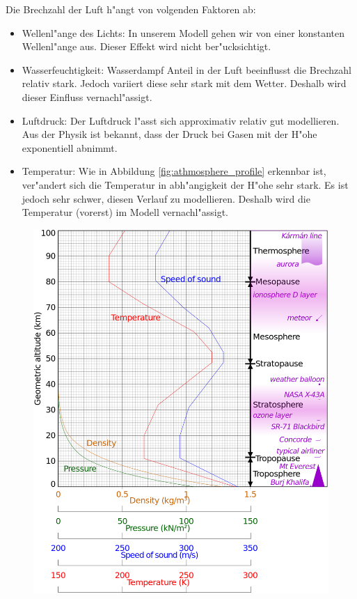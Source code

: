\begin{refsection}
Die Brechzahl der Luft h"angt von volgenden Faktoren ab:
\begin{itemize}
  \item Wellenl"ange des Lichts: In unserem Modell gehen wir von einer konstanten Wellenl"ange aus. Dieser Effekt wird nicht ber"ucksichtigt.
  \item Wasserfeuchtigkeit: Wasserdampf Anteil in der Luft beeinflusst die Brechzahl relativ stark. Jedoch variiert diese sehr stark mit dem Wetter. Deshalb wird dieser Einfluss vernachl"assigt. 
  \item Luftdruck: Der Luftdruck l"asst sich approximativ relativ gut modellieren. Aus der Physik ist bekannt, dass der Druck bei Gasen mit der H"ohe exponentiell abnimmt. 
  \item Temperatur: Wie in Abbildung \ref{fig:athmosphere_profile} erkennbar ist, ver"andert sich die Temperatur in abh"angigkeit der H"ohe sehr stark. Es ist jedoch sehr schwer, diesen Verlauf zu modellieren. Deshalb wird die Temperatur (vorerst) im Modell vernachl"assigt.
\end{itemize}

\begin{figure}
  \centering
  \includegraphics[scale=0.24]{licht/images/athmosphereProfile.png}
  

\end{figure}
\end{refsection}
